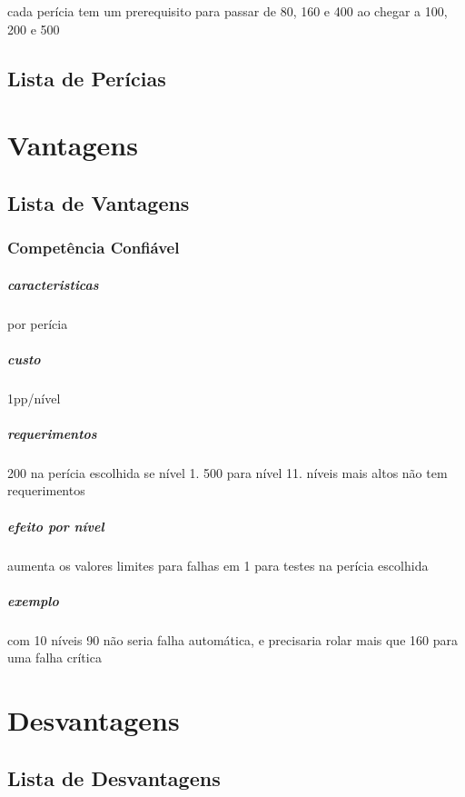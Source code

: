 cada perícia tem um prerequisito para passar de 80, 160 e 400
ao chegar a 100, 200 e 500 
%
%
% 
%
%
%
\section{Lista de Perícias}
%
%
%
%
\chapter{Vantagens}
\section{Lista de Vantagens}
%
\subsection{Competência Confiável}
\paragraph{caracteristicas} por perícia
\paragraph{custo} 1pp/nível
\paragraph{requerimentos} 200 na perícia escolhida se nível 1. 500 para nível 11. níveis mais altos não tem requerimentos
\paragraph{efeito por nível} aumenta os valores limites para falhas em 1 para testes na perícia escolhida
\paragraph{exemplo} com 10 níveis 90 não seria falha automática, e precisaria rolar mais que 160 para uma falha crítica
%
%
\chapter{Desvantagens}
\section{Lista de Desvantagens}
% 
% 
% 
%
%
%
%
